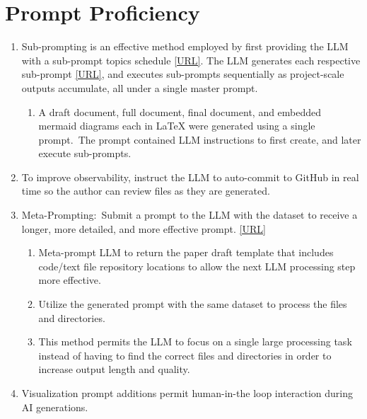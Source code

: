 \documentclass{article}
\begin{document}
 

\section{Prompt Proficiency}

\begin{enumerate}
\item Sub-prompting is an effective method employed by first providing the LLM with a sub-prompt topics schedule \href{https://github.com/kevinkawchak/physical-ai-oncology-trials/blob/main/trial-protocol/prompts/prompt-protocol.md}{[URL]}. The LLM generates each respective sub-prompt \href{https://github.com/kevinkawchak/physical-ai-oncology-trials/tree/main/trial-protocol/sub-prompts}{[URL]}, and executes sub-prompts sequentially as project-scale outputs accumulate, all under a single master prompt. 
\begin{enumerate}
    \item A draft document, full document, final document, and embedded mermaid diagrams each in LaTeX were generated using a single prompt.\ The prompt contained LLM instructions to first create, and later execute sub-prompts. \cite{2026Ph2Darax, 2026OnPremis, 2026HR9510FL, 2026ClinTrst, 2026CongVote} 
\end{enumerate}
\item To improve observability, instruct the LLM to auto-commit to GitHub in real time so the author can review files as they are generated.
\item Meta-Prompting:\ Submit a prompt to the LLM with the dataset to receive a longer, more detailed, and more effective prompt. \href{https://github.com/kevinkawchak/Clinical-AI-Demos/blob/main/national-repositories/build-national.md}{[URL]}
\begin{enumerate}
    \item Meta-prompt LLM to return the paper draft template that includes code/text file repository locations to allow the next LLM processing step more effective.
    \item Utilize the generated prompt with the same dataset to process the files and directories.
    \item This method permits the LLM to focus on a single large processing task instead of having to find the correct files and directories in order to increase output length and quality.
\end{enumerate}
\item Visualization prompt additions permit human-in-the loop interaction during AI generations. 

\end{enumerate}
\end{document}
